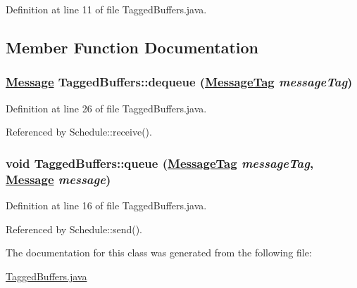 Definition at line 11 of file Tagged\-Buffers.java.

\subsection{Member Function Documentation}
\hypertarget{classTaggedBuffers_a2}{
\subsubsection[dequeue]{\setlength{\rightskip}{0pt plus 5cm}\hyperlink{interfaceMessage}{Message} Tagged\-Buffers::dequeue (\hyperlink{interfaceMessageTag}{Message\-Tag} {\em message\-Tag})}}
\label{classTaggedBuffers_a2}




Definition at line 26 of file Tagged\-Buffers.java.

Referenced by Schedule::receive().

\hypertarget{classTaggedBuffers_a1}{
\subsubsection[queue]{\setlength{\rightskip}{0pt plus 5cm}void Tagged\-Buffers::queue (\hyperlink{interfaceMessageTag}{Message\-Tag} {\em message\-Tag}, \hyperlink{interfaceMessage}{Message} {\em message})}}
\label{classTaggedBuffers_a1}




Definition at line 16 of file Tagged\-Buffers.java.

Referenced by Schedule::send().



The documentation for this class was generated from the following file:\begin{CompactItemize}
\item 
\hyperlink{TaggedBuffers_8java-source}{Tagged\-Buffers.java}\end{CompactItemize}
